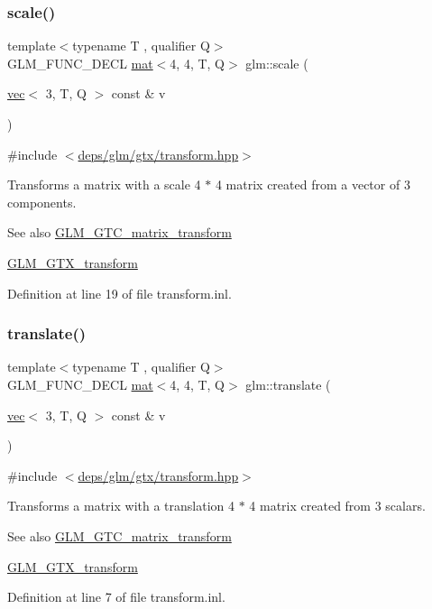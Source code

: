 \subsubsection{\texorpdfstring{scale()}{scale()}}
{\footnotesize\ttfamily template$<$typename T , qualifier Q$>$ \\
G\+L\+M\+\_\+\+F\+U\+N\+C\+\_\+\+D\+E\+CL \hyperlink{structglm_1_1mat}{mat}$<$4, 4, T, Q$>$ glm\+::scale (\begin{DoxyParamCaption}\item[{\hyperlink{structglm_1_1vec}{vec}$<$ 3, T, Q $>$ const \&}]{v }\end{DoxyParamCaption})}



{\ttfamily \#include $<$\hyperlink{transform_8hpp}{deps/glm/gtx/transform.\+hpp}$>$}

Transforms a matrix with a scale 4 $\ast$ 4 matrix created from a vector of 3 components. \begin{DoxySeeAlso}{See also}
\hyperlink{group__gtc__matrix__transform}{G\+L\+M\+\_\+\+G\+T\+C\+\_\+matrix\+\_\+transform} 

\hyperlink{group__gtx__transform}{G\+L\+M\+\_\+\+G\+T\+X\+\_\+transform} 
\end{DoxySeeAlso}


Definition at line 19 of file transform.\+inl.

\mbox{\label{group__gtx__transform_ga309a30e652e58c396e2c3d4db3ee7658}} 
\subsubsection{\texorpdfstring{translate()}{translate()}}
{\footnotesize\ttfamily template$<$typename T , qualifier Q$>$ \\
G\+L\+M\+\_\+\+F\+U\+N\+C\+\_\+\+D\+E\+CL \hyperlink{structglm_1_1mat}{mat}$<$4, 4, T, Q$>$ glm\+::translate (\begin{DoxyParamCaption}\item[{\hyperlink{structglm_1_1vec}{vec}$<$ 3, T, Q $>$ const \&}]{v }\end{DoxyParamCaption})}



{\ttfamily \#include $<$\hyperlink{transform_8hpp}{deps/glm/gtx/transform.\+hpp}$>$}

Transforms a matrix with a translation 4 $\ast$ 4 matrix created from 3 scalars. \begin{DoxySeeAlso}{See also}
\hyperlink{group__gtc__matrix__transform}{G\+L\+M\+\_\+\+G\+T\+C\+\_\+matrix\+\_\+transform} 

\hyperlink{group__gtx__transform}{G\+L\+M\+\_\+\+G\+T\+X\+\_\+transform} 
\end{DoxySeeAlso}


Definition at line 7 of file transform.\+inl.

